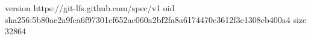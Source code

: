 version https://git-lfs.github.com/spec/v1
oid sha256:5b80ae2a9fca6f97301cf652ac060a2bf2fa8a6174470c3612f3c1308eb400a4
size 32864
